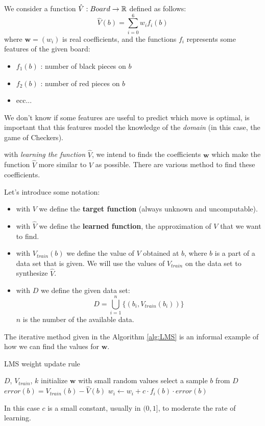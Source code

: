 \documentclass[10pt, letterpaper]{report}
\begin{document}
We consider a function $\hat V: Board\rightarrow{\mathbb R}$ defined as follows:\begin{equation}
    \hat V(b)=\sum_{i=0}^6w_if_i(b)
\end{equation}
where $\mathbf w = (w_i)$ is real coefficients, and the functions $f_i$ represents some features of the given board:\begin{itemize}
    \item $f_1(b)$ : number of black pieces on $b$
    \item $f_2(b)$ : number of red pieces on $b$
    \item ecc...
\end{itemize}
We don't know if some features are useful to predict which move is optimal, is important that this features model the knowledge of the \textit{domain} (in this case, the game of Checkers). \bigskip

with \textit{learning the function} $\hat V$, we intend to finds the coefficients $\mathbf w$ which make the function $\hat V$ more similar to $V$ as possible. There are various method to find these coefficients.\bigskip

Let's introduce some notation:\begin{itemize}
    \item with $V$ we  define the \textbf{target function} (always unknown and uncomputable).
    \item with $\hat V$ we  define the \textbf{learned function}, the approximation of $V$ that we want to find.
    \item with $V_{train}(b)$ we define the value of $V$ obtained at $b$, where $b$ is a part of a data set that is given. We will use the values of $V_{train}$ on the data set to synthesize $\hat V$.
    \item with $D$ we define the given data set:\begin{equation}
        D=\bigcup_{i=1}^n\{(b_i,V_{train}(b_i))\}
    \end{equation}
    $n$ is the number of the available data.
\end{itemize}
The iterative method given in the Algorithm \ref{alg:LMS} is an informal example of how we can find the values for $\mathbf w$.
\begin{algorithm}
    \caption{LMS weight update rule}\label{alg:LMS}
    \begin{algorithmic}
    \Require $D$, $V_{train}$, $k$
    \State initialize $\mathbf w$ with small random values 
    \State select a sample $b$ from $D$
    \State $error(b)=V_{train}(b)-\hat V(b)$
    \State $w_i\leftarrow w_i+c\cdot f_i(b)\cdot error(b)$
    \EndFor
    \EndFor
    \end{algorithmic}
\end{algorithm}
In this case $c$ is a small constant, usually in $(0,1]$, to moderate the rate of learning.\bigskip
\end{document}
